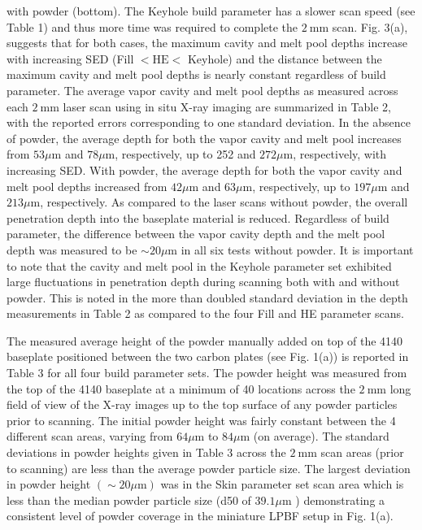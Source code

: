 \documentclass[10pt]{article}
\begin{document}
with powder (bottom). The Keyhole build parameter has a slower scan speed (see Table 1) and thus more time was required to complete the $2 \mathrm{~mm}$ scan. Fig. 3(a), suggests that for both cases, the maximum cavity and melt pool depths increase with increasing SED (Fill $<\mathrm{HE}<$ Keyhole) and the distance between the maximum cavity and melt pool depths is nearly constant regardless of build parameter. The average vapor cavity and melt pool depths as measured across each $2 \mathrm{~mm}$ laser scan using in situ X-ray imaging are summarized in Table 2, with the reported errors corresponding to one standard deviation. In the absence of powder, the average depth for both the vapor cavity and melt pool increases from $53 \mu \mathrm{m}$ and $78 \mu \mathrm{m}$, respectively, up to 252 and $272 \mu \mathrm{m}$, respectively, with increasing SED. With powder, the average depth for both the vapor cavity and melt pool depths increased from $42 \mu \mathrm{m}$ and $63 \mu \mathrm{m}$, respectively, up to $197 \mu \mathrm{m}$ and $213 \mu \mathrm{m}$, respectively. As compared to the laser scans without powder, the overall penetration depth into the baseplate material is reduced. Regardless of build parameter, the difference between the vapor cavity depth and the melt pool depth was measured to be $\sim 20 \mu \mathrm{m}$ in all six tests without powder. It is important to note that the cavity and melt pool in the Keyhole parameter set exhibited large fluctuations in penetration depth during scanning both with and without powder. This is noted in the more than doubled standard deviation in the depth measurements in Table 2 as compared to the four Fill and HE parameter scans.

The measured average height of the powder manually added on top of the 4140 baseplate positioned between the two carbon plates (see Fig. 1(a)) is reported in Table 3 for all four build parameter sets. The powder height was measured from the top of the 4140 baseplate at a minimum of 40 locations across the $2 \mathrm{~mm}$ long field of view of the X-ray images up to the top surface of any powder particles prior to scanning. The initial powder height was fairly constant between the 4 different scan areas, varying from $64 \mu \mathrm{m}$ to $84 \mu \mathrm{m}$ (on average). The standard deviations in powder heights given in Table 3 across the $2 \mathrm{~mm}$ scan areas (prior to scanning) are less than the average powder particle size. The largest deviation in powder height $(\sim 20 \mu \mathrm{m})$ was in the Skin parameter set scan area which is less than the median powder particle size (d50 of $39.1 \mu \mathrm{m}$ ) demonstrating a consistent level of powder coverage in the miniature LPBF setup in Fig. 1(a).
\end{document}
